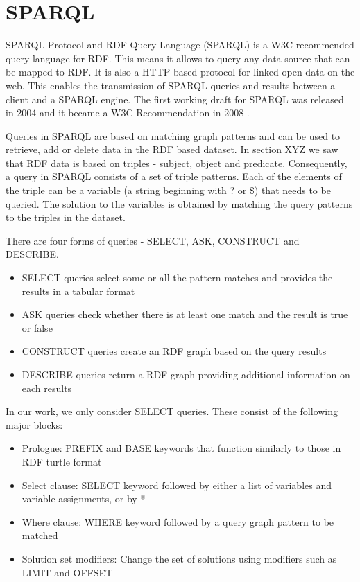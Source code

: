 \section{SPARQL}
SPARQL Protocol and RDF Query Language (SPARQL) is a W3C recommended query language for RDF. This means it allows to query any data source that can be mapped to RDF. It is also a HTTP-based protocol for linked open data on the web. This enables the transmission of SPARQL queries and results between a client and a SPARQL engine. The first working draft for SPARQL was released in 2004 and it became a W3C Recommendation in 2008 \cite{Perez2009}. 

Queries in SPARQL are based on matching graph patterns and can be used to retrieve, add or delete data in the RDF based dataset. In section XYZ we saw that RDF data is based on triples - subject, object and predicate. Consequently, a query in SPARQL consists of a set of triple patterns. Each of the elements of the triple can be a variable (a string beginning with ? or \$) that needs to be queried. The solution to the variables is obtained by matching the query patterns to the triples in the dataset.

There are four forms of queries - SELECT, ASK, CONSTRUCT and DESCRIBE. 
\begin{itemize}
\item SELECT queries select some or all the pattern matches and provides the results in a tabular format
\item ASK queries check whether there is at least one match and the result is true or false
\item CONSTRUCT queries create an RDF graph based on the query results
\item DESCRIBE queries return a RDF graph providing additional information on each results
\end{itemize}

In our work, we only consider SELECT queries. These consist of the following major blocks:
\begin{itemize}
\item Prologue: PREFIX and BASE keywords that function similarly to those in RDF turtle format
\item Select clause: SELECT keyword followed by either a list of variables and variable assignments, or by *
\item Where clause: WHERE keyword followed by a query graph pattern to be matched
\item Solution set modifiers: Change the set of solutions using modifiers such as LIMIT and OFFSET
\end{itemize}

